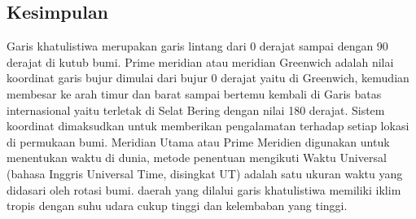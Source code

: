 \subsection{Kesimpulan}	
	Garis khatulistiwa merupakan garis lintang dari 0 derajat sampai dengan 90 derajat di kutub bumi. Prime meridian atau meridian Greenwich adalah nilai koordinat garis bujur dimulai dari bujur 0 derajat yaitu di Greenwich, kemudian membesar ke arah timur dan barat sampai bertemu kembali di Garis batas internasional yaitu terletak di Selat Bering dengan nilai 180 derajat. Sistem koordinat dimaksudkan untuk memberikan pengalamatan terhadap setiap lokasi di permukaan bumi. Meridian Utama atau Prime Meridien digunakan untuk menentukan waktu di dunia, metode penentuan mengikuti Waktu Universal (bahasa Inggris Universal Time, disingkat UT) adalah satu ukuran waktu yang didasari oleh rotasi bumi. daerah yang dilalui garis khatulistiwa memiliki iklim tropis 
dengan suhu udara cukup tinggi dan kelembaban yang tinggi.
